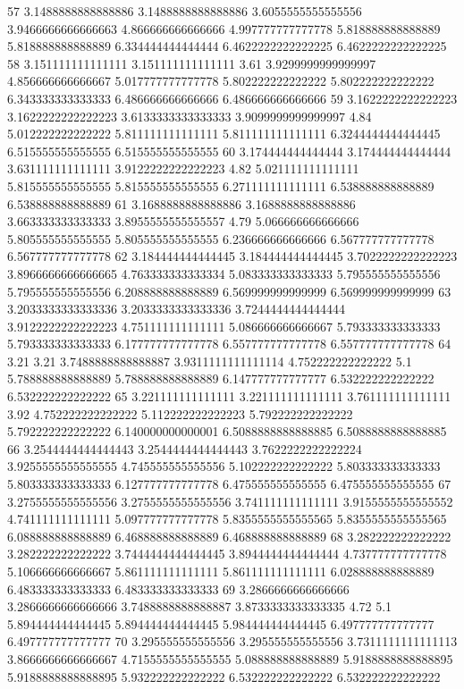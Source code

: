 57 3.1488888888888886 3.1488888888888886 3.6055555555555556 3.9466666666666663 4.866666666666666 4.997777777777778 5.818888888888889 5.818888888888889 6.334444444444444 6.4622222222222225 6.4622222222222225
58 3.151111111111111 3.151111111111111 3.61 3.9299999999999997 4.856666666666667 5.017777777777778 5.802222222222222 5.802222222222222 6.343333333333333 6.486666666666666 6.486666666666666
59 3.1622222222222223 3.1622222222222223 3.6133333333333333 3.9099999999999997 4.84 5.012222222222222 5.811111111111111 5.811111111111111 6.3244444444444445 6.515555555555555 6.515555555555555
60 3.174444444444444 3.174444444444444 3.631111111111111 3.9122222222222223 4.82 5.021111111111111 5.815555555555555 5.815555555555555 6.271111111111111 6.538888888888889 6.538888888888889
61 3.1688888888888886 3.1688888888888886 3.663333333333333 3.8955555555555557 4.79 5.066666666666666 5.805555555555555 5.805555555555555 6.236666666666666 6.567777777777778 6.567777777777778
62 3.184444444444445 3.184444444444445 3.7022222222222223 3.8966666666666665 4.763333333333334 5.083333333333333 5.795555555555556 5.795555555555556 6.208888888888889 6.569999999999999 6.569999999999999
63 3.2033333333333336 3.2033333333333336 3.7244444444444444 3.9122222222222223 4.751111111111111 5.086666666666667 5.793333333333333 5.793333333333333 6.177777777777778 6.557777777777778 6.557777777777778
64 3.21 3.21 3.7488888888888887 3.9311111111111114 4.752222222222222 5.1 5.788888888888889 5.788888888888889 6.147777777777777 6.532222222222222 6.532222222222222
65 3.221111111111111 3.221111111111111 3.761111111111111 3.92 4.752222222222222 5.112222222222223 5.792222222222222 5.792222222222222 6.140000000000001 6.5088888888888885 6.5088888888888885
66 3.2544444444444443 3.2544444444444443 3.7622222222222224 3.9255555555555555 4.745555555555556 5.102222222222222 5.803333333333333 5.803333333333333 6.127777777777778 6.475555555555555 6.475555555555555
67 3.2755555555555556 3.2755555555555556 3.741111111111111 3.9155555555555552 4.741111111111111 5.097777777777778 5.8355555555555565 5.8355555555555565 6.088888888888889 6.468888888888889 6.468888888888889
68 3.282222222222222 3.282222222222222 3.7444444444444445 3.8944444444444444 4.737777777777778 5.106666666666667 5.861111111111111 5.861111111111111 6.028888888888889 6.483333333333333 6.483333333333333
69 3.2866666666666666 3.2866666666666666 3.7488888888888887 3.8733333333333335 4.72 5.1 5.894444444444445 5.894444444444445 5.984444444444445 6.497777777777777 6.497777777777777
70 3.295555555555556 3.295555555555556 3.7311111111111113 3.8666666666666667 4.7155555555555555 5.088888888888889 5.9188888888888895 5.9188888888888895 5.932222222222222 6.532222222222222 6.532222222222222
